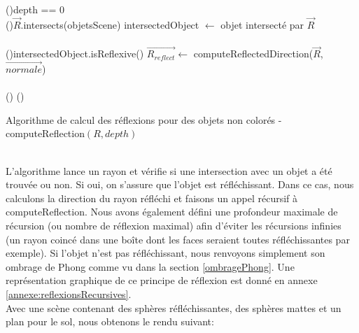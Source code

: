 \documentclass[11pt]{article}
\begin{document}
\begin{algorithm}[H]
	\DontPrintSemicolon

	\If(){depth == 0}
	{
	}
	\hfill\\

	\If(){$\overrightarrow{R}$.intersects(objetsScene)}
	{
		intersectedObject $\gets$ objet intersecté par $\overrightarrow{R}$\\\hfill\\

		\If(){intersectedObject.isReflexive()}
		{
			$\overrightarrow{R_{reflect}} \gets$ computeReflectedDirection($\overrightarrow{R}$, $\overrightarrow{normale}$)\\\hfill\\

		}
		\Else()
		{
		}
	}
	\Else()
	{
	}

	\caption{Algorithme de calcul des réflexions pour des objets non colorés - computeReflection$(R, depth)$}
	\label{algoReflections}
\end{algorithm}
\hfill\\
L'algorithme lance un rayon et vérifie si une intersection avec un objet a été trouvée ou non. Si oui, on s'assure que l'objet est réfléchissant. Dans ce cas, nous calculons la direction du rayon réfléchi et faisons un appel récursif à computeReflection. Nous avons également défini une profondeur maximale de récursion (ou nombre de réflexion maximal) afin d'éviter les récursions infinies (un rayon coincé dans une boîte dont les faces seraient toutes réfléchissantes par exemple). Si l'objet n'est pas réfléchissant, nous renvoyons simplement son ombrage de Phong comme vu dans la section \ref{ombragePhong}. Une représentation graphique de ce principe de réflexion est donné en annexe \ref{annexe:reflexionsRecursives}.\\
Avec une scène contenant des sphères réfléchissantes, des sphères mattes et un plan pour le sol, nous obtenons le rendu suivant: 
\end{document}
